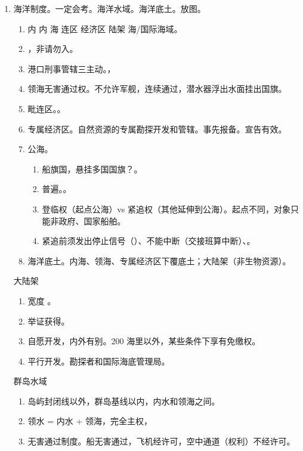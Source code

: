 \begin{enumerate}
  \item 海洋制度。一定会考。海洋水域。海洋底土。放图。
        \begin{enumerate}
          \item 内 \yjt 内 \yjt {}海 \yjt {}连区 \yjt {}经济区 \yjt {}陆架 \yjt {}海/国际海域。
          \item {}，非请勿入。
          \item 港口刑事管辖三主动。，
          \item 领海无害通过权。不允许军舰，连续通过，潜水器浮出水面挂出国旗。
          \item 毗连区。。
          \item 专属经济区。自然资源的专属勘探开发和管辖。事先报备。宣告有效。
          \item 公海。
                \begin{enumerate}
                  \item 船旗国，悬挂多国国旗？。
                  \item 普遍。。
                  \item 登临权（起点公海）vs 紧追权（其他延伸到公海）。起点不同，对象只能非政府、国家船舶。
                  \item 紧追前须发出停止信号（）、不能中断（交接班算中断）、。
                \end{enumerate}
          \item 海洋底土。内海、领海、专属经济区下覆底土；大陆架（非生物资源）。
        \end{enumerate}

        \begin{kk}{大陆架}
          \begin{enumerate}
            \item 宽度 。
            \item 举证获得。
            \item 自愿开发，内外有别。200 海里以外，某些条件下享有免缴权。
            \item 平行开发。勘探者和国际海底管理局。
          \end{enumerate}
        \end{kk}

        \begin{kk}{群岛水域}
          \begin{enumerate}
            \item 岛屿封闭线以外，群岛基线以内，内水和领海之间。
            \item 领水 = 内水 + 领海，完全主权，
            \item 无害通过制度。船无害通过，飞机经许可，空中通道（权利）不经许可。
          \end{enumerate}
        \end{kk}


\end{enumerate}
